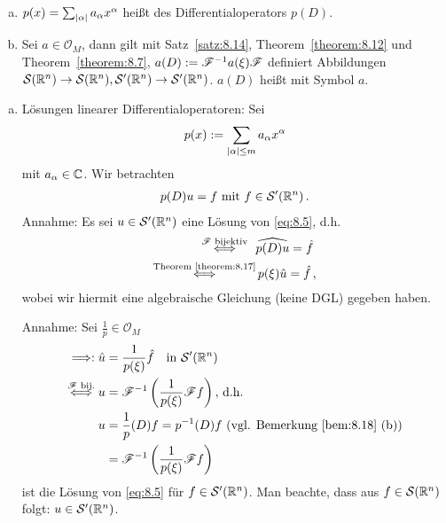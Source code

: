 \begin{bem}
\label{bem:8.18}
\begin{enumerate}[(a)]
\item $p(x) = \sum_{\lvert \alpha\rvert} a_\alpha x^\alpha$ heißt  des Differentialoperators $p(D)$.
\item Sei $a \in \mathcal O_M$, dann gilt mit Satz~\ref{satz:8.14}, Theorem~\ref{theorem:8.12} und Theorem~\ref{theorem:8.7}, $a(D) := \mathscr{F}^{-1} a(\xi) \mathscr{F}$ definiert Abbildungen $\mathcal S(\mathbb{R}^n) \rightarrow \mathcal S(\mathbb{R}^n),\mathcal S'(\mathbb{R}^n) \rightarrow \mathcal S'(\mathbb{R}^n)$. $a(D)$ heißt  mit Symbol $a$.
\end{enumerate}
\end{bem}

\begin{bsp}
\label{bsp:8.19}
\begin{enumerate}[(a)]
\item Lösungen linearer Differentialoperatoren: Sei 
\[
	p(x) := \sum_{\lvert \alpha\rvert\leq m} a_\alpha x^\alpha
\]
 mit $a_\alpha \in \mathbb{C}$. Wir betrachten
 \begin{align}
 \label{eq:8.5}
 	p(D) u = f\text{ mit }f \in \mathcal S'(\mathbb{R}^n) \, .
\end{align}
Annahme: Es sei $u \in \mathcal S'(\mathbb{R}^n)$ eine Lösung von \eqref{eq:8.5}, d.h.
\begin{align*}
	\stackrel{\scriptsize \F\text{ bijektiv}}\Longleftrightarrow \ \ & \widehat{p(D)u} = \hat f \\
	 \stackrel{\scriptsize\text{Theorem}~\ref{theorem:8.17}}\Longleftrightarrow & \,  p(\xi) \hat u = \hat f \, ,
\end{align*}
wobei wir hiermit eine algebraische Gleichung (keine DGL) gegeben haben.

Annahme: Sei $\frac 1 p \in \mathcal O_M$
\begin{align*}
	 \Longrightarrow : \hat u & = \frac 1{p(\xi)} \hat f \quad \text{in } \mathcal S'(\mathbb{R}^n) \\
	\stackrel{\scriptsize\mathscr{F}\text{ bij.}}\Longleftrightarrow u & = \mathscr{F}^{-1} \left(\frac 1 {p(\xi)} \mathscr{F} f\right) , \, \text{d.h.} \\
	u & = \frac 1 p (D) f = p^{-1}(D) f \text{ (vgl. Bemerkung~\ref{bem:8.18} (b))} \\
	& = \mathscr{F}^{-1} \left(\frac 1{p(\xi)} \mathscr{F} f\right)
\end{align*}
ist die Lösung von \eqref{eq:8.5} für $f \in \mathcal S'(\mathbb{R}^n)$. Man beachte, dass aus $f \in \mathcal S(\mathbb{R}^n)$ folgt: $u \in \mathcal S'(\mathbb{R}^n)$.


\end{enumerate}
\end{bsp}
